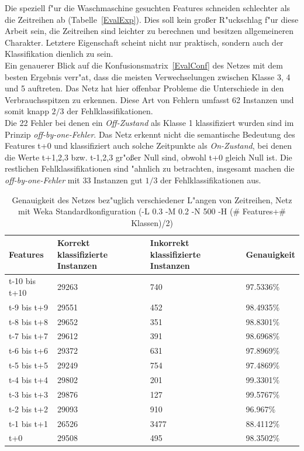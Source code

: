 Die speziell f"ur die Waschmaschine gesuchten Features schneiden schlechter als die Zeitreihen ab (Tabelle~\ref{EvalExp}). Dies soll kein gro{\ss}er R"uckschlag f"ur diese Arbeit sein, die Zeitreihen sind leichter zu berechnen und besitzen allgemeineren Charakter. Letztere Eigenschaft scheint nicht nur praktisch, sondern auch der Klassifikation dienlich zu sein.\\

Ein genauerer Blick auf die Konfusionsmatrix~\ref{EvalConf} des Netzes mit dem besten Ergebnis verr"at, dass die meisten Verwechselungen zwischen Klasse 3, 4 und 5 auftreten. Das Netz hat hier offenbar Probleme die Unterschiede in den Verbrauchsspitzen zu erkennen. Diese Art von Fehlern umfasst 62 Instanzen und somit knapp $2/3$ der Fehlklassifikationen. \\
Die 22 Fehler bei denen ein \textit{Off-Zustand} als Klasse 1 klassifiziert wurden sind im Prinzip \textit{off-by-one-Fehler}. Das Netz erkennt nicht die semantische Bedeutung des Features t+0 und klassifiziert auch solche Zeitpunkte als \textit{On-Zustand}, bei denen die Werte t+1,2,3 bzw. t-1,2,3 gr"o{\ss}er Null sind, obwohl t+0 gleich Null ist. Die restlichen Fehlklassifikationen sind "ahnlich zu betrachten, insgesamt machen die \textit{off-by-one-Fehler} mit 33 Instanzen gut $1/3$ der Fehlklassifikationen aus. \\

\begin{table}[h]
\begin{tabular}{l|p{4cm}|p{4cm}|l}
Features & Korrekt klassifizierte Instanzen & Inkorrekt klassifizierte Instanzen & Genauigkeit  \\
\hline
t-10 bis t+10 & 29263 & 740 & 97.5336\% \\
t-9 bis t+9 & 29551 & 452 & 98.4935\% \\
t-8 bis t+8 & 29652 & 351 & 98.8301\% \\
t-7 bis t+7 & 29612 & 391 & 98.6968\% \\
t-6 bis t+6 & 29372 & 631 & 97.8969\% \\
t-5 bis t+5 & 29249 & 754 & 97.4869\% \\
t-4 bis t+4 & 29802 & 201 & 99.3301\% \\
t-3 bis t+3 & 29876 & 127 & 99.5767\% \\
t-2 bis t+2 & 29093 & 910 & 96.967\% \\
t-1 bis t+1 & 26526 & 3477 & 88.4112\% \\
t+0 & 29508 & 495 & 98.3502\% 
\end{tabular}
\caption[Genauigkeit der Zeitreihen Features]{Genauigkeit des Netzes bez"uglich verschiedener L"angen von Zeitreihen, Netz mit Weka Standardkonfiguration (-L 0.3 -M 0.2 -N 500 -H (\# Features+\# Klassen)/2)}
\label{EvalZeit}
\end{table}


